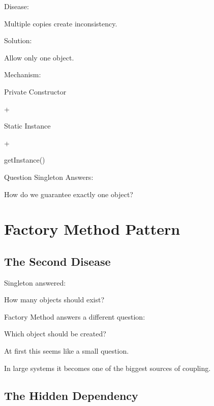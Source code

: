 \documentclass[11pt,a4paper]{book}
\begin{document}
\begin{compressionbox}

Disease:

Multiple copies create inconsistency.

Solution:

Allow only one object.

Mechanism:

Private Constructor

+

Static Instance

+

getInstance()

Question Singleton Answers:

\begin{center}
How do we guarantee exactly one object?
\end{center}

\end{compressionbox}
\chapter{Factory Method Pattern}

\section{The Second Disease}

\begin{idea}

Singleton answered:

\begin{center}
How many objects should exist?
\end{center}

Factory Method answers a different question:

\begin{center}
Which object should be created?
\end{center}

\end{idea}

At first this seems like a small question.

In large systems it becomes one of the biggest sources
of coupling.


\section{The Hidden Dependency}
\end{document}
